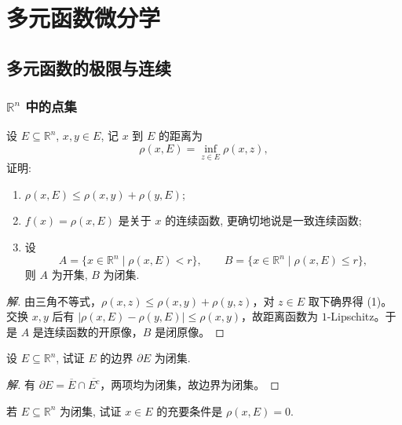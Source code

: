\documentclass[../../数学分析培优讲义(答案版).tex]{subfiles}
\begin{document}
\setcounter{chapter}{9}
\pagestyle{fancy}

\chapter{多元函数微分学}

\section{多元函数的极限与连续}

\subsection{\texorpdfstring{$\mathbb{R}^n$}{Rⁿ} 中的点集}

\begin{example}[\markstar]
设 $E\subseteq\mathbb{R}^n$, $x,y\in E$, 记 $x$ 到 $E$ 的距离为
\[
    \rho(x,E)=\inf_{z\in E}\rho(x,z),
\]
证明:
\begin{enumerate}[label=(\arabic*)]
    \item $\rho(x,E)\leq\rho(x,y)+\rho(y,E)$;
    \item $f(x)=\rho(x,E)$ 是关于 $x$ 的连续函数, 更确切地说是一致连续函数;
    \item 设
    \[
        A=\{x\in\mathbb{R}^n\mid \rho(x,E)<r\},\qquad
        B=\{x\in\mathbb{R}^n\mid \rho(x,E)\leq r\},
    \]
    则 $A$ 为开集, $B$ 为闭集.
\end{enumerate}
\end{example}

\begin{proof}[解]
由三角不等式，$\rho(x,z)\leq\rho(x,y)+\rho(y,z)$，对 $z\in E$ 取下确界得 (1)。交换 $x,y$ 后有 $|\rho(x,E)-\rho(y,E)|\leq\rho(x,y)$，故距离函数为 $1$-Lipschitz。于是 $A$ 是连续函数的开原像，$B$ 是闭原像。
\end{proof}

\begin{example}
设 $E\subseteq\mathbb{R}^n$, 试证 $E$ 的边界 $\partial E$ 为闭集.
\end{example}

\begin{proof}[解]
有 $\partial E=\overline E\cap\overline{E^c}$，两项均为闭集，故边界为闭集。
\end{proof}

\begin{example}
若 $E\subseteq\mathbb{R}^n$ 为闭集, 试证 $x\in E$ 的充要条件是 $\rho(x,E)=0$.
\end{example}
\end{document}
